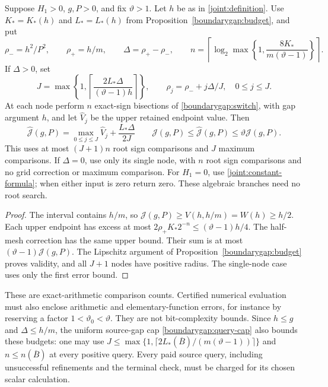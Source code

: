 \begin{proposition}
\label{joint:budget}
Suppose $H_1>0$, $g,P>0$, and fix $\vartheta>1$. Let $h$ be as in
\eqref{joint:definition}. Use $K_*=K_*(h)$ and $L_*=L_*(h)$ from
Proposition~\ref{boundarygap:budget}, and put
\[
 \rho_-=h^2/P^2,\qquad \rho_+=h/m,\qquad
 \Delta=\rho_+-\rho_-,\qquad
 n=\left\lceil\log_2\max\left\{1,
                  \frac{8K_*}{m(\vartheta-1)}\right\}\right\rceil.
\]
If $\Delta>0$, set
\[
 J=\max\left\{1,\left\lceil
       \frac{2L_*\Delta}{(\vartheta-1)h}\right\rceil\right\},
 \qquad \rho_j=\rho_-+j\Delta/J,\quad 0\le j\le J.
\]
At each node perform $n$ exact-sign bisections of
\eqref{boundarygap:switch}, with gap argument $h$, and let
$\widehat V_j$ be the upper retained endpoint value. Then
\[
 \widehat{\mathcal J}(g,P)=
 \max_{0\le j\le J}\widehat V_j+\frac{L_*\Delta}{2J}
 \qquad
 \mathcal J(g,P)\le\widehat{\mathcal J}(g,P)
                    \le\vartheta\mathcal J(g,P).
\]
This uses at most $(J+1)n$ root sign comparisons and $J$ maximum
comparisons. If $\Delta=0$, use only its single node, with $n$
root sign comparisons and no grid correction or maximum comparison.
For $H_1=0$, use \eqref{joint:constant-formula}; when either input
is zero return zero. These algebraic branches need no root search.
\end{proposition}
\begin{proof}
The interval contains $h/m$, so
$\mathcal J(g,P)\ge V(h,h/m)=W(h)\ge h/2$.
Each upper endpoint has excess at most
$2\rho_+K_*2^{-n}\le(\vartheta-1)h/4$.
The half-mesh correction has the same upper bound. Their sum is
at most $(\vartheta-1)\mathcal J(g,P)$. The Lipschitz argument of
Proposition~\ref{boundarygap:budget} proves validity, and all
$J+1$ nodes have positive radius. The single-node case uses only
the first error bound.
\end{proof}

These are exact-arithmetic comparison counts. Certified numerical
evaluation must also enclose arithmetic and elementary-function
errors, for instance by reserving a factor
$1<\vartheta_0<\vartheta$. They are not bit-complexity bounds.
Since $h\le g$ and $\Delta\le h/m$, the uniform source-gap cap
\eqref{boundarygap:query-cap} also bounds these budgets: one may use
$J\le\max\{1,\lceil2L_*(\overline B)/(m(\vartheta-1))\rceil\}$
and $n\le n(\overline B)$ at every positive query. Every paid
source query, including unsuccessful refinements and the terminal
check, must be charged for its chosen scalar calculation.
